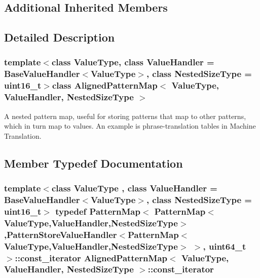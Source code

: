 \subsection*{Additional Inherited Members}


\subsection{Detailed Description}
\subsubsection*{template$<$class Value\+Type, class Value\+Handler = Base\+Value\+Handler$<$\+Value\+Type$>$, class Nested\+Size\+Type = uint16\+\_\+t$>$class Aligned\+Pattern\+Map$<$ Value\+Type, Value\+Handler, Nested\+Size\+Type $>$}

A nested pattern map, useful for storing patterns that map to other patterns, which in turn map to values. An example is phrase-\/translation tables in Machine Translation. 

\subsection{Member Typedef Documentation}
\hypertarget{classAlignedPatternMap_a1dd59a53ad5586979698949f2845a1ee}{}
\subsubsection[{const\+\_\+iterator}]{\setlength{\rightskip}{0pt plus 5cm}template$<$class Value\+Type , class Value\+Handler  = Base\+Value\+Handler$<$\+Value\+Type$>$, class Nested\+Size\+Type  = uint16\+\_\+t$>$ typedef {\bf Pattern\+Map}$<$ {\bf Pattern\+Map}$<$Value\+Type,Value\+Handler,Nested\+Size\+Type$>$,{\bf Pattern\+Store\+Value\+Handler}$<${\bf Pattern\+Map}$<$Value\+Type,Value\+Handler,Nested\+Size\+Type$>$ $>$, uint64\+\_\+t $>$\+::{\bf const\+\_\+iterator} {\bf Aligned\+Pattern\+Map}$<$ Value\+Type, Value\+Handler, Nested\+Size\+Type $>$\+::{\bf const\+\_\+iterator}}\label{classAlignedPatternMap_a1dd59a53ad5586979698949f2845a1ee}
\hypertarget{classAlignedPatternMap_ac784198ebf47e631d2feb1c9d6063b1b}{}
